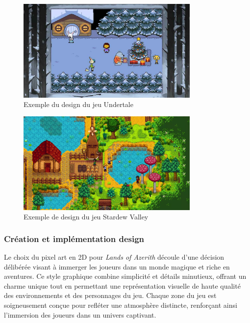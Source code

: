 \begin{figure}[H]
      \centering
      \includegraphics[width=0.8\textwidth]{assets/undertale.png}
      \caption{Exemple du design du jeu Undertale}
      \label{fig:undertale}
\end{figure}

\begin{figure}[H]
      \centering
      \includegraphics[width=0.8\textwidth]{assets/stardueley.png}
      \caption{Exemple de design du jeu Stardew Valley}
      \label{fig:stardueley}
\end{figure}

\subsubsection{Création et implémentation design}

Le choix du pixel art en 2D pour \textit{Lands of Azerith} découle d'une décision délibérée visant à immerger les joueurs dans un monde magique et riche en aventures.
Ce style graphique combine simplicité et détails minutieux, offrant un charme unique tout en permettant une représentation visuelle de haute qualité des environnements et des personnages du jeu.
Chaque zone du jeu est soigneusement conçue pour refléter une atmosphère distincte, renforçant ainsi l'immersion des joueurs dans un univers captivant.

